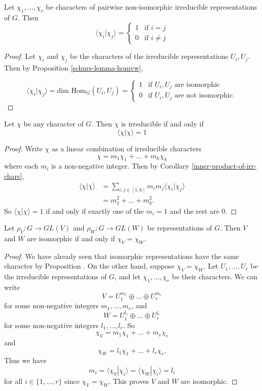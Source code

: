 \begin{cor}\label{inner-product-of-irr-chars}
Let $\chi_1, \ldots, \chi_r$ be characters of pairwise non-isomorphic irreducible representations of $G$.  Then
\[ \langle \chi_i | \chi_j \rangle = \begin{cases}  1 &\text{if } i = j \\ 0 &\text{if } i \neq j\end{cases} \]
\end{cor}
\begin{proof}
Let $\chi_i$ and $\chi_j$ be the characters of the irreducible representations $U_i, U_j$.  Then by Proposition \ref{schurs-lemma-homvw},

\[ \langle \chi_i | \chi_j \rangle = \text{dim Hom}_G (U_i, U_j) = \begin{cases}  1 &\text{if }U_i, U_j \text{ are isomorphic} \\  0 &\text{if }U_i, U_j \text{ are not isomorphic}. \end{cases} \]
\end{proof}

\begin{cor}
Let $\chi$ be any character of $G$.    Then $\chi$ is irreducible if and only if \[ \langle \chi | \chi \rangle = 1\]
\end{cor}
\begin{proof}
Write $\chi$ as a linear combination of irreducible characters \[ \chi = m_1 \chi_1 + \ldots + m_k \chi_k \] where each $m_i$ is a non-negative integer.  Then by Corollary \ref{inner-product-of-irr-chars}, 
\begin{align*}
\langle \chi | \chi \rangle &= \sum_{i,j \in [1, k]} m_i m_j \langle \chi_i | \chi_j \rangle \\
&= m_1^2 + \ldots + m_k^2.
\end{align*}
So $\langle \chi | \chi \rangle = 1$ if and only if exactly one of the $m_i = 1$ and the rest are $0$.
\end{proof}

\begin{cor}
Let $\rho_V \colon G \to GL(V)$ and $\rho_W \colon G \to GL(W)$ be representations of $G$.  Then $V$ and $W$ are isomorphic if and only if $\chi_V = \chi_W$.
\end{cor}
\begin{proof}
We have already seen that isomorphic representations have the same character by Proposition \label{iso-reprns-same-char}.  On the other hand, suppose $\chi_V = \chi_W$.  Let $U_1, \ldots, U_r$ be the irreducible representations of $G$, and let $\chi_1, \ldots, \chi_r$ be their characters.  We can write
\[ V = U_1^{m_1} \oplus \ldots \oplus U_r^{m_r} \]
for some non-negative integers $m_1, \ldots, m_r$, and 
\[ W = U_1^{l_1} \oplus \ldots \oplus U_r^{l_r} \]
for some non-negative integers $l_1, \ldots, l_r$.  So
\[ \chi_V = m_1 \chi_1 + \ldots + m_r \chi_r \]
and 
\[ \chi_W = l_1 \chi_1 + \ldots + l_r \chi_r .\]
Thus we have 
\[ m_i = \langle \chi_V | \chi_i \rangle = \langle \chi_W | \chi_i \rangle = l_i \]
for all $i \in \{1, \ldots, r \}$ since $\chi_V = \chi_W$.  This proves $V$ and $W$ are isomorphic.
\end{proof}


